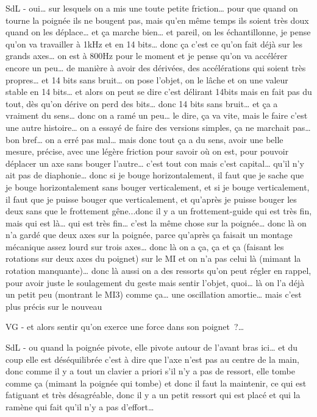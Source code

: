SdL - oui… sur lesquels on a mis une toute petite friction… pour que quand on tourne la poignée ils ne bougent pas, mais qu'en même temps ils soient très doux quand on les déplace… et ça marche bien… et pareil, on les échantillonne, je pense qu'on va travailler à 1kHz et en 14 bits… donc ça c'est ce qu'on fait déjà sur les grands axes… on est à 800Hz pour le moment et je pense qu'on va accélérer encore un peu… de manière à avoir des dérivées, des accélérations qui soient très propres… et 14 bits sans bruit… on pose l'objet, on le lâche et on une valeur stable en 14 bits… et alors on peut se dire c'est délirant 14bits mais en fait pas du tout, dès qu'on dérive on perd des bits… donc 14 bits sans bruit… et ça a vraiment du sens… donc on a ramé un peu… le dire, ça va vite, mais le faire c'est une autre histoire… on a essayé de faire des versions simples, ça ne marchait pas… bon bref… on a erré pas mal… mais donc tout ça a du sens, avoir une belle mesure, précise, avec une légère friction pour savoir où on est, pour pouvoir déplacer un axe sans bouger l'autre… c'est tout con mais c'est capital… qu'il n'y ait pas de diaphonie… donc si je bouge horizontalement, il faut que je sache que je bouge horizontalement sans bouger verticalement, et si je bouge verticalement, il faut que je puisse bouger que verticalement, et qu'après je puisse bouger les deux sans que le frottement gêne...donc il y a un frottement-guide qui est très fin, mais qui est là… qui est très fin… c'est la même chose sur la poignée… donc là on n'a gardé que deux axes sur la poignée, parce qu'après ça faisait un montage mécanique assez lourd sur trois axes… donc là on a ça, ça et ça (faisant les rotations sur deux axes du poignet) sur le MI et on n'a pas celui là (mimant la rotation manquante)… donc là aussi on a des ressorts qu'on peut régler en rappel, pour avoir juste le soulagement du geste mais sentir l'objet, quoi… là on l'a déjà un petit peu (montrant le MI3)  comme ça… une oscillation amortie… mais c'est plus précis sur le nouveau 

VG - et alors sentir qu'on exerce une force dans son poignet ?… 

SdL - ou quand la poignée pivote, elle pivote autour de l'avant bras ici… et du coup elle est déséquilibrée c'est à dire que l'axe n'est pas au centre de la main, donc comme il y a tout un clavier a priori s'il n'y a pas de ressort, elle tombe comme ça (mimant la poignée qui tombe) et donc il faut la maintenir, ce qui est fatiguant et très désagréable, donc il y a un petit ressort qui est placé et qui la ramène qui fait qu'il n'y a pas d'effort… 

